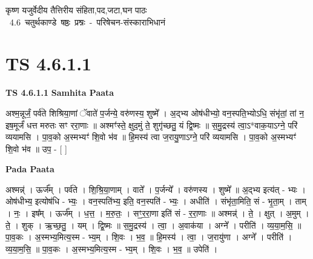 \documentclass[17pt]{extarticle}
\begin{document}
\begin{titlepage}
    \begin{center}
 
\begin{sanskrit}
    { \Huge
    कृष्ण यजुर्वेदीय तैत्तिरीय संहिता,पद,जटा,घन पाठः 
    }
    \\
    \vspace{2.5cm}
    \mbox{ \Huge
    4.6      चतुर्थकाण्डे षष्ठः प्रश्नः - परिषेचन-संस्काराभिधानं   }
\end{sanskrit}
\end{center}

\end{titlepage}
\tableofcontents
\pagebreak

\section*{ TS 4.6.1.1 }

\textbf{TS 4.6.1.1 } \newline
\textbf{Samhita Paata} \newline

अश्म॒न्नूर्जं॒ पर्व॑ते शिश्रिया॒णां ॅवाते॑ प॒र्जन्ये॒ वरु॑णस्य॒ शुष्मे᳚ । अ॒द्भ्य ओष॑धीभ्यो॒ वन॒स्पति॒भ्योऽधि॒ संभृ॑तां॒ तां न॒ इष॒मूर्जं॑ धत्त मरुतः सꣳ ररा॒णाः ॥ अश्मꣳ॑स्ते॒ क्षुद॒मुं ते॒ शुगृ॑च्छतु॒ यं द्वि॒ष्मः ॥ स॒मु॒द्रस्य॑ त्वा॒ऽ*वाक॒याऽग्ने॒ परि॑ व्ययामसि । पा॒व॒को अ॒स्मभ्यꣳ॑ शि॒वो भ॑व ॥ हि॒मस्य॑ त्वा ज॒रायु॒णाऽग्ने॒ परि॑ व्ययामसि । पा॒व॒को अ॒स्मभ्यꣳ॑ शि॒वो भ॑व ॥ उप॒ - [  ] \newline

\textbf{Pada Paata} \newline

अश्मन्न्॑ । ऊर्ज᳚म् । पर्व॑ते । शि॒श्रि॒या॒णाम् । वाते᳚ । प॒र्जन्ये᳚ । वरु॑णस्य । शुष्मे᳚ ॥ अ॒द्भ्य इत्य॑त् - भ्यः । ओष॑धीभ्य॒ इत्योष॑धि - भ्यः॒ । वन॒स्पति॑भ्य॒ इति॒ वन॒स्पति॑ - भ्यः॒ । अधीति॑ । संभृ॑ता॒मिति॒ सं - भृ॒ता॒म् । ताम् । नः॒ । इष᳚म् । ऊर्ज᳚म् । ध॒त्त॒ । म॒रु॒तः॒ । सꣳ॒॒र॒रा॒णा इति॑ सं - र॒रा॒णाः ॥ अश्मन्न्॑ । ते॒ । क्षुत् । अ॒मुम् । ते॒ । शुक् । ऋ॒च्छ॒तु॒ । यम् । द्वि॒ष्मः ॥ स॒मु॒द्रस्य॑ । त्वा॒ । अ॒वाक॑या । अग्ने᳚ । परीति॑ । व्य॒या॒म॒सि॒ ॥ पा॒व॒कः । अ॒स्मभ्य॒मित्य॒स्म - भ्य॒म् । शि॒वः । भ॒व॒ ॥ हि॒मस्य॑ । त्वा॒ । ज॒रायु॑णा । अग्ने᳚ । परीति॑ । व्य॒या॒म॒सि॒ ॥ पा॒व॒कः । अ॒स्मभ्य॒मित्य॒स्म - भ्य॒म् । शि॒वः । भ॒व॒ ॥ उपेति॑ ।  \newline
\end{document}
